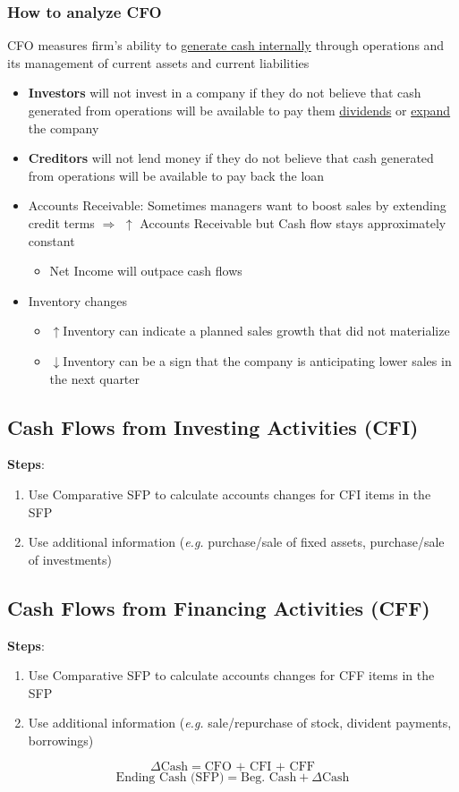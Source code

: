 \documentclass{article}
\newcommand{\eg}[0]{\textit{e.g. }}
\begin{document}
\begin{multicols}{2}
\subsubsection{How to analyze CFO}
CFO measures firm's ability to \underline{generate cash internally} through operations and its management of current assets and current liabilities
\begin{itemize}
	\item \textbf{Investors} will not invest in a company if they do not believe that cash generated from operations will be available to pay them \underline{dividends} or \underline{expand} the company
	\item \textbf{Creditors} will not lend money if they do not believe that cash generated from operations will be available to pay back the loan
	\item Accounts Receivable: Sometimes managers want to boost sales by extending credit terms $\Rightarrow$ $\uparrow$ Accounts Receivable but Cash flow stays approximately constant
	\begin{itemize}
		\item Net Income will outpace cash flows
	\end{itemize}
    \item Inventory changes
    \begin{itemize}
    	\item $\uparrow$Inventory can indicate a planned sales growth that did not materialize
    	\item $\downarrow$Inventory can be a sign that the company is anticipating lower sales in the next quarter
    \end{itemize}
\end{itemize}

\subsection{Cash Flows from Investing Activities (CFI)}
\textbf{Steps}:
\begin{enumerate}
	\item Use Comparative SFP to calculate accounts changes for CFI items in the SFP
	\item Use additional information (\eg purchase/sale of fixed assets, purchase/sale of investments)
\end{enumerate}

\subsection{Cash Flows from Financing Activities (CFF)}
\textbf{Steps}:
\begin{enumerate}
	\item Use Comparative SFP to calculate accounts changes for CFF items in the SFP
	\item Use additional information (\eg sale/repurchase of stock, divident payments, borrowings)
\end{enumerate}
$$\Delta \text{Cash} = \text{CFO + CFI + CFF}$$
$$\text{Ending Cash (SFP)} = \text{Beg. Cash} + \Delta\text{Cash}$$


\end{multicols}
\end{document}
